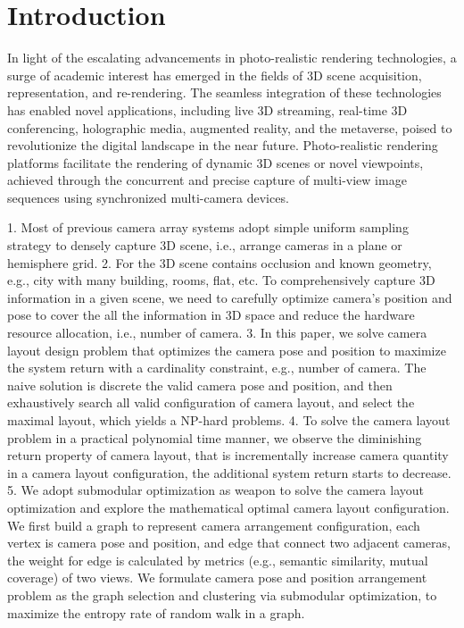 \section{Introduction}
In light of the escalating advancements in photo-realistic rendering technologies, a surge of academic interest has emerged in the fields of 3D scene acquisition, representation, and re-rendering. The seamless integration of these technologies has enabled novel applications, including live 3D streaming, real-time 3D conferencing, holographic media, augmented reality, and the metaverse, poised to revolutionize the digital landscape in the near future.
Photo-realistic rendering platforms facilitate the rendering of dynamic 3D scenes or novel viewpoints, achieved through the concurrent and precise capture of multi-view image sequences using synchronized multi-camera devices. 


1. Most of previous camera array systems adopt simple uniform sampling strategy to densely capture 3D scene, i.e., arrange cameras in a plane or hemisphere grid.
2. For the 3D scene contains occlusion and known geometry, e.g., city with many building, rooms, flat, etc. To comprehensively capture 3D information in a given scene, we need to carefully optimize camera's position and pose to cover the all the information in 3D space and reduce the hardware resource allocation, i.e., number of camera.
3. In this paper, we solve camera layout design problem that optimizes the camera pose and position to maximize the system return with a cardinality constraint, e.g., number of camera. The naive solution is discrete the valid camera pose and position, and then exhaustively search all valid configuration of camera layout, and select the maximal layout, which yields a NP-hard problems.
4. To solve the camera layout problem in a practical polynomial time manner, we observe the diminishing return property of camera layout, that is incrementally increase camera quantity in a camera layout configuration, the additional system return starts to decrease.
5. We adopt submodular optimization as weapon to solve the camera layout optimization and explore the mathematical optimal camera layout configuration. We first build a graph to represent camera arrangement configuration, each vertex is camera pose and position, and edge that connect two adjacent cameras, the weight for edge is calculated by metrics (e.g., semantic similarity, mutual coverage) of two views. We formulate camera pose and position arrangement problem as the graph selection and clustering via submodular optimization, to maximize the entropy rate of random walk in a graph.


